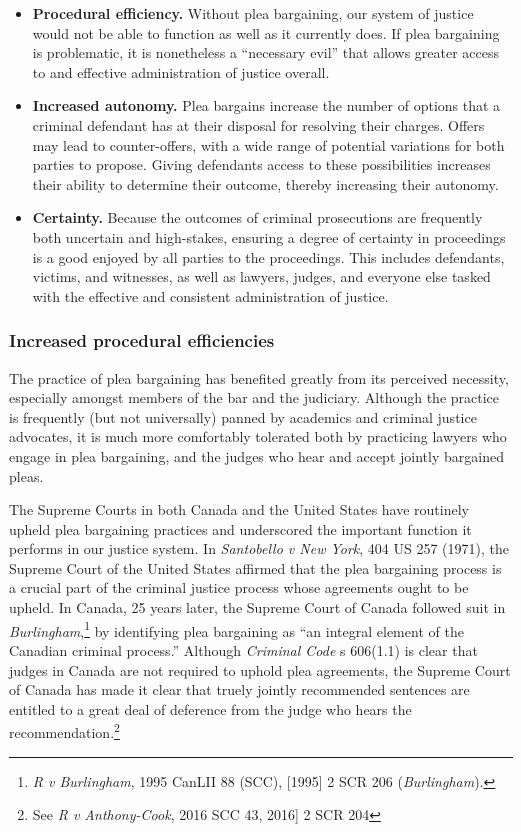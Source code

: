 \begin{itemize}
\item \textbf{Procedural efficiency.} Without plea bargaining, our system of justice would not be able to function as well as it currently does. If plea bargaining is problematic, it is nonetheless a ``necessary evil'' that allows greater access to and effective administration of justice overall.
\item \textbf{Increased autonomy.} Plea bargains increase the number of options that a criminal defendant has at their disposal for resolving their charges. Offers may lead to counter-offers, with a wide range of potential variations for both parties to propose. Giving defendants access to these possibilities increases their ability to determine their outcome, thereby increasing their autonomy.
\item \textbf{Certainty.} Because the outcomes of criminal prosecutions are frequently both uncertain and high-stakes, ensuring a degree of certainty in proceedings is a good enjoyed by all parties to the proceedings. This includes defendants, victims, and witnesses, as well as lawyers, judges, and everyone else tasked with the effective and consistent administration of justice.
\end{itemize}

\subsubsection{Increased procedural efficiencies}

The practice of plea bargaining has benefited greatly from its perceived necessity, especially amongst members of the bar and the judiciary. Although the practice is frequently (but not universally) panned by academics and criminal justice advocates, it is much more comfortably tolerated both by practicing lawyers who engage in plea bargaining, and the judges who hear and accept jointly bargained pleas. 

The Supreme Courts in both Canada and the United States have routinely upheld plea bargaining practices and underscored the important function it performs in our justice system. In \textit{Santobello v New York}, 404 US 257 (1971), the Supreme Court of the United States affirmed that the plea bargaining process is a crucial part of the criminal justice process whose agreements ought to be upheld. In Canada, 25 years later, the Supreme Court of Canada followed suit in \textit{Burlingham},\footnote{\textit{R v Burlingham}, 1995 CanLII 88 (SCC), [1995] 2 SCR 206 (\textit{Burlingham}).} by identifying plea bargaining as ``an integral element of the Canadian criminal process.'' Although \textit{Criminal Code} s 606(1.1) is clear that judges in Canada are not required to uphold plea agreements, the Supreme Court of Canada has made it clear that truely jointly recommended sentences are entitled to a great deal of deference from the judge who hears the recommendation.\footnote{See \textit{R v Anthony-Cook}, 2016 SCC 43, 2016] 2 SCR 204}

